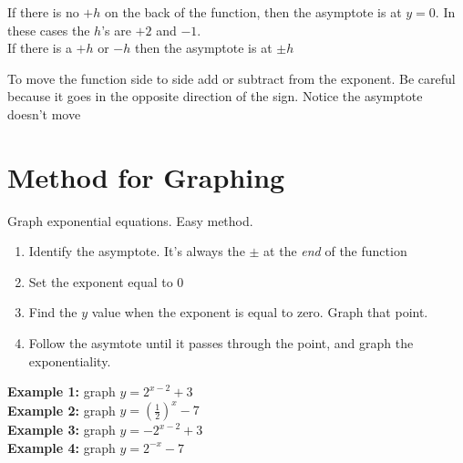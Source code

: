 \documentclass[12pt]{article}
\begin{document}
If there is no $+h$ on the back of the function, then the asymptote is at $y=0$. In these cases the $h$'s are $+2$ and $-1$.\\

If there is a $+h$ or $-h$ then the asymptote is at $\pm h$\\

\hrulefill

To move the function side to side add or subtract from the exponent. Be careful because it goes in the opposite direction of the sign. Notice the asymptote doesn't move\\

\begin{center}
\end{center}

\pagebreak

\section*{Method for Graphing}

Graph exponential equations. Easy method.

\begin{enumerate}
	\item Identify the asymptote. It's always the $\pm$ at the \textit{end} of the function
	
	\item Set the exponent equal to $0$
	
	\item Find the $y$ value when the exponent is equal to zero. Graph that point.
	
	\item Follow the asymtote until it passes through the point, and graph the exponentiality. \\
\end{enumerate}

\begin{multicols}{2}

\textbf{Example 1:} graph $y=2^{x-2}+3$\\


\textbf{Example 2:} graph $y=\left(\frac{1}{2} \right)^{x}-7$\\


\textbf{Example 3:} graph $y=-2^{x-2}+3$\\


\textbf{Example 4:} graph $y=2^{-x}-7$\\


\end{multicols}
\end{document}
